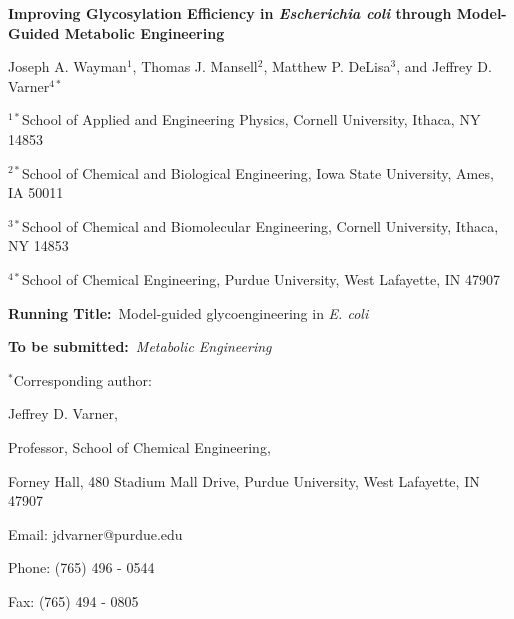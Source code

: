 \documentclass[12pt]{article}
\date{}
\begin{document}
\begin{titlepage}

{\par\centering\textbf{\Large Improving Glycosylation Efficiency in \textit{Escherichia coli} through Model-Guided Metabolic Engineering}}
\vspace{0.05in}
{\par \centering \large{Joseph A. Wayman$^{1}$, Thomas J. Mansell$^{2}$, Matthew P. DeLisa$^{3}$, and Jeffrey D. Varner$^{4*}$}}
\vspace{0.10in}
{\par \centering \large{$^{1*}$School of Applied and Engineering Physics, Cornell University, Ithaca, NY 14853}}
{\par \centering \large{$^{2*}$School of Chemical and Biological Engineering, Iowa State University, Ames, IA 50011}}
{\par \centering \large{$^{3*}$School of Chemical and Biomolecular Engineering, Cornell University, Ithaca, NY 14853}}
{\par \centering \large{$^{4*}$School of Chemical Engineering, Purdue University, West Lafayette, IN 47907}}
\vspace{0.1in}
{\par \centering \textbf{Running Title:}~Model-guided glycoengineering in \textit{E. coli}}
\vspace{0.1in}
{\par \centering \textbf{To be submitted:}~\emph{Metabolic Engineering}}
\vspace{0.5in}
{\par \centering $^{*}$Corresponding author:}
{\par \centering Jeffrey D. Varner,}
{\par \centering Professor, School of Chemical Engineering,}
{\par \centering Forney Hall, 480 Stadium Mall Drive, Purdue University, West Lafayette, IN 47907} 
{\par \centering Email: jdvarner@purdue.edu}
{\par \centering Phone: (765) 496 - 0544} 
{\par \centering Fax: (765) 494 - 0805} 
\end{titlepage}
\date{}
\thispagestyle{empty}
\pagebreak

\end{document}

